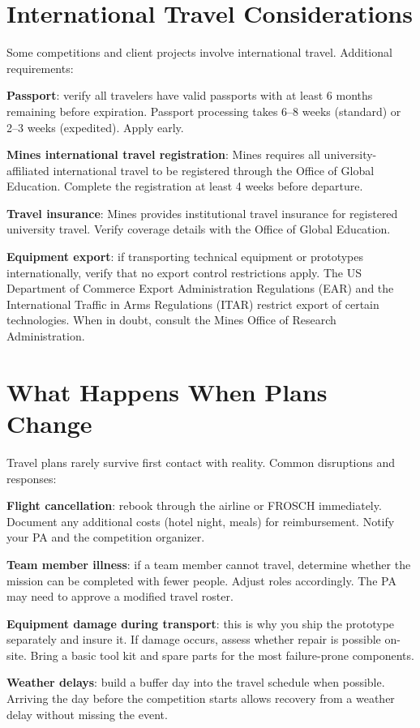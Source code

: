 \section{International Travel Considerations}
Some competitions and client projects involve international travel. Additional requirements:

\textbf{Passport}: verify all travelers have valid passports with at least 6 months remaining before expiration. Passport processing takes 6--8 weeks (standard) or 2--3 weeks (expedited). Apply early.

\textbf{Mines international travel registration}: Mines requires all university-affiliated international travel to be registered through the Office of Global Education. Complete the registration at least 4 weeks before departure.

\textbf{Travel insurance}: Mines provides institutional travel insurance for registered university travel. Verify coverage details with the Office of Global Education.

\textbf{Equipment export}: if transporting technical equipment or prototypes internationally, verify that no export control restrictions apply. The US Department of Commerce Export Administration Regulations (EAR) and the International Traffic in Arms Regulations (ITAR) restrict export of certain technologies. When in doubt, consult the Mines Office of Research Administration.

\section{What Happens When Plans Change}
Travel plans rarely survive first contact with reality. Common disruptions and responses:

\textbf{Flight cancellation}: rebook through the airline or FROSCH immediately. Document any additional costs (hotel night, meals) for reimbursement. Notify your PA and the competition organizer.

\textbf{Team member illness}: if a team member cannot travel, determine whether the mission can be completed with fewer people. Adjust roles accordingly. The PA may need to approve a modified travel roster.

\textbf{Equipment damage during transport}: this is why you ship the prototype separately and insure it. If damage occurs, assess whether repair is possible on-site. Bring a basic tool kit and spare parts for the most failure-prone components.

\textbf{Weather delays}: build a buffer day into the travel schedule when possible. Arriving the day before the competition starts allows recovery from a weather delay without missing the event.



